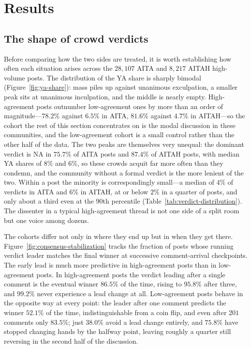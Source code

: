 \section{Results}
\label{sec:results}


\subsection{The shape of crowd verdicts}
\label{subsec:res-distribution}

Before comparing how the two sides are treated, it is worth establishing how
often each situation arises across the $28{,}107$ AITA and $8{,}217$ AITAH
high-volume posts. The distribution of the YA share is sharply bimodal
(Figure~\ref{fig:ya-share}): mass piles up against unanimous exculpation, a
smaller peak sits at unanimous inculpation, and the middle is nearly empty.
High-agreement posts outnumber low-agreement ones by more than an order of
magnitude---$78.2\%$ against $6.5\%$ in AITA, $81.6\%$ against $4.7\%$ in
AITAH---so the cohort the rest of this section concentrates on is the modal
discussion in these communities, and the low-agreement cohort is a small control
rather than the other half of the data. The two peaks are themselves very
unequal: the dominant verdict is NA in $75.7\%$ of AITA posts and $87.4\%$ of
AITAH posts, with median YA shares of $8\%$ and $6\%$, so these crowds acquit
far more often than they condemn, and the community without a formal verdict is
the more lenient of the two. Within a post the minority is correspondingly
small---a median of $4\%$ of verdicts in AITA and $6\%$ in AITAH, at or below
$2\%$ in a quarter of posts, and only about a third even at the $90$th
percentile (Table~\ref{tab:verdict-distribution}). The dissenter in a typical
high-agreement thread is not one side of a split room but one voice among dozens.

The cohorts differ not only in where they end up but in when they get there.
Figure~\ref{fig:consensus-stabilization} tracks the fraction of posts whose
running verdict leader matches the final winner at successive comment-arrival
checkpoints. The early lead is much more predictive in high-agreement posts
than in low-agreement posts. In
high-agreement posts the verdict leading after a single comment is the eventual
winner $86.5\%$ of the time, rising to $95.8\%$ after three, and $99.2\%$ never
experience a lead change at all. Low-agreement posts behave in the opposite way at
every point: the leader after one comment predicts the winner $52.1\%$ of the
time, indistinguishable from a coin flip, and even after $201$ comments only
$83.5\%$; just $38.0\%$ avoid a lead change entirely, and $75.8\%$ have stopped
changing hands by the halfway point, leaving roughly a quarter still reversing
in the second half of the discussion.

